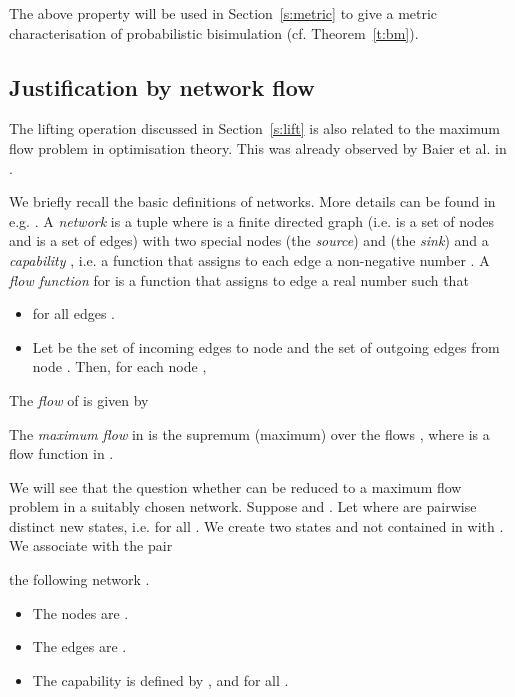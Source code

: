 \documentclass{article}
\begin{document}
The above property will be used in Section~\ref{s:metric} to give a
metric characterisation of probabilistic bisimulation (cf.
Theorem~\ref{t:bm}).

\subsection{Justification by network flow}
The lifting operation discussed in Section~\ref{s:lift} is also
related to the maximum flow problem in optimisation theory. This was
already observed by Baier et al. in \cite{BEM00}.

 We briefly recall the basic definitions of
networks. More details can be found in e.g. \cite{Eve79}. A
\emph{network} is a tuple  where  is a
finite directed graph (i.e.  is a set of nodes and  is a set of edges) with two special nodes  (the
\emph{source}) and  (the \emph{sink}) and a \emph{capability}
, i.e. a function that assigns to each edge  a
non-negative number . A \emph{flow function}  for 
is a function that assigns to edge  a real number  such
that
\begin{itemize}
\item  for all edges .
\item Let  be the set of incoming edges to node  and
   the set of outgoing edges from node . Then, for each
  node ,
  
\end{itemize}
The \emph{flow}  of  is given by

The \emph{maximum flow} in  is the supremum (maximum) over the
flows , where  is a flow function in .

 We will see that
the question whether  can be reduced to a
maximum flow problem in a suitably chosen network. Suppose
 and . Let
 where  are pairwise distinct new states, i.e.  for
all . We create two states  and  not contained
in  with . We associate with the pair

 the following network . \begin{itemize}
\item The nodes are .
\item The edges are .
\item The capability  is defined by ,
   and  for all .
\end{itemize}
\end{document}

